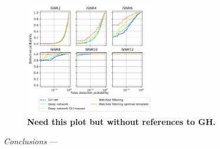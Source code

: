 \documentclass[%
 amsmath,amssymb,
 aps,
 twocolumn,
]{revtex4-1}
\begin{document}
\begin{figure}[]
 \includegraphics[width=0.5\textwidth]
 {figures/ROC_curves_both_up.png}
 \caption{\label{fig: ROC curve} \textbf{Need this plot but without references to GH.}}
\end{figure}

\textit{Conclusions} --- 



\nocite{*}

\end{document}
